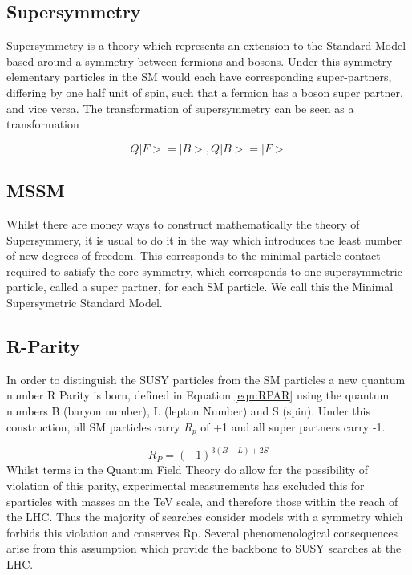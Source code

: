\begin{description}
\section{Supersymmetry}
Supersymmetry is a theory which represents an extension to the Standard Model based around a symmetry between fermions and bosons. Under this symmetry elementary particles in the SM would each have corresponding super-partners, differing by one half unit of spin, such that a fermion has a boson super partner, and vice versa. The transformation of supersymmetry can be seen as a transformation 

\begin{equation}
Q|F> = |B>, 	Q|B> = |F> 
\label{eqn:Q}
\end{equation}




\subsection{MSSM} 

Whilst there are money ways to construct mathematically the theory of Supersymmery, it is usual to do it in the way which introduces the least number of new degrees of freedom. This corresponds to the minimal particle contact required to satisfy the core symmetry, which corresponds to one supersymmetric particle, called a super partner, for each SM particle. We call this the Minimal Supersymetric Standard Model. 

\subsection{R-Parity}

In order to distinguish the SUSY particles from the SM particles a new quantum number R Parity  is born, defined in Equation \ref{eqn:RPAR} using the quantum numbers B (baryon number), L (lepton Number) and S (spin). Under this construction, all SM particles carry $R_{p}$ of +1 and all super partners carry -1. 

\begin{equation}
R_{P} = (-1)^{3(B-L)+2S}
\label{eqn:RPAR}
\end{equation}
Whilst terms in the Quantum Field Theory do allow for the possibility of violation of this parity, experimental measurements has excluded this for sparticles with masses on the TeV scale, and therefore those within the reach of the LHC. Thus the  majority of searches consider models with a symmetry which forbids this violation and conserves Rp. Several phenomenological consequences arise from this assumption which provide the backbone to SUSY searches at the LHC. 


\end{description}
